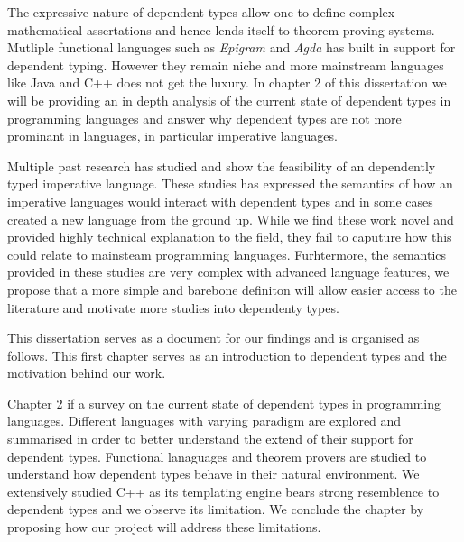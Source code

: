 \documentclass[a4paper,12pt]{report}
\begin{document}
\par
The expressive nature of dependent types allow one to define complex 
mathematical assertations and hence lends itself to theorem proving systems. 
Mutliple functional languages such as \textit{Epigram} 
\cite{epigram} and \textit{Agda} \cite{agda} has 
built in support for dependent typing. However they remain niche and more 
mainstream languages like Java and C++ does not get the luxury. In chapter 2 of 
this dissertation we will be providing an in depth analysis of the current state 
of dependent types in programming languages and answer why dependent types are 
not more prominant in languages, in particular imperative languages.

\par
Multiple past research has studied and show the feasibility of an dependently typed 
imperative language. These studies has expressed the semantics of 
how an imperative languages would interact with dependent types and in some 
cases created a new language from the ground up. While we find these work novel 
and provided highly technical explanation to the field, they fail to caputure 
how this could relate to mainsteam programming languages. Furhtermore, the 
semantics provided in these studies are very complex with advanced language 
features, we propose that a more simple and barebone definiton will allow easier 
access to the literature and motivate more studies into dependenty types. 

\par
This dissertation serves as a document for our findings and is organised as 
follows. This first chapter serves as an introduction to dependent types and the 
motivation behind our work.

\par
Chapter 2 if a survey on the current state of dependent types 
in programming languages. Different languages with varying paradigm are explored 
and summarised in order to better understand the extend of their support 
for dependent types. Functional lanaguages and theorem provers are studied to 
understand how dependent types behave in their natural environment. We 
extensively studied C++ as its templating engine bears strong resemblence to 
dependent types and we observe its limitation. 
We conclude the chapter by proposing how our project will address these limitations. 
\end{document}
